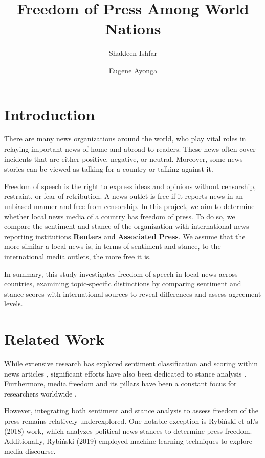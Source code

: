 \documentclass{article}
\title{Freedom of Press Among World Nations}
\author{Shakleen Ishfar \and Eugene Ayonga}
\theoremstyle{mytheoremstyle}
\theoremstyle{mytheoremstyle}
\theoremstyle{myproblemstyle}
\begin{document}
    \maketitle

    \section{Introduction}

    There are many news organizations around the world, who play vital roles in relaying important news of home and abroad to readers. These news often cover incidents that are either positive, negative, or neutral. Moreover, some news stories can be viewed as talking for a country or talking against it. 

    Freedom of speech is the right to express ideas and opinions without censorship, restraint, or fear of retribution. A news outlet is free if it reports news in an unbiased manner and free from censorship. In this project, we aim to determine whether local news media of a country has freedom of press. To do so, we compare the sentiment and stance of the organization with international news reporting institutions \textbf{Reuters} and \textbf{Associated Press}. We assume that the more similar a local news is, in terms of sentiment and stance, to the international media outlets, the more free it is. 
    
    In summary, this study investigates freedom of speech in local news across countries, examining topic-specific distinctions by comparing sentiment and stance scores with international sources to reveal differences and assess agreement levels.

    \section{Related Work}

    While extensive research has explored sentiment classification and scoring within news articles \cite{godbole2007large, bautin2008international}, significant efforts have also been dedicated to stance analysis \cite{haddington2004stance, hanselowski2018retrospective}. Furthermore, media freedom and its pillars have been a constant focus for researchers worldwide \cite{balvcytiene2021crisis, oster2015media, meyen2016crime}.

    However, integrating both sentiment and stance analysis to assess freedom of the press remains relatively underexplored. One notable exception is Rybiński et al.'s (2018) work, which analyzes political news stances to determine press freedom. \cite{rybinski2018political} Additionally, Rybiński (2019) employed machine learning techniques to explore media discourse. \cite{rybinski2019machine}
\end{document}
